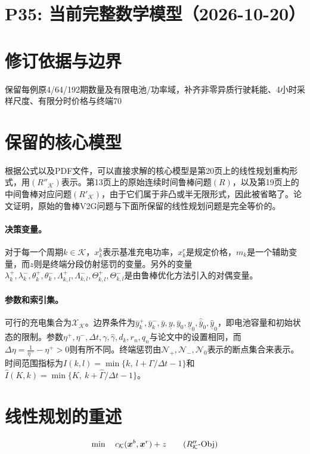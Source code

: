 \documentclass[11pt]{ctexart}
\begin{document}
\section*{P35: 当前完整数学模型（2026-10-20）}
\section*{修订依据与边界}保留每例原4/64/192期数量及有限电池/功率域，补齐非零异质行驶耗能、4小时采样尺度、有限分时价格与终端70%




\section*{保留的核心模型}
根据\texttt{}公式以及PDF文件，可以直接求解的核心模型是第20页上的线性规划重构形式，用$(R''_{\mathcal K})$表示。第13页上的原始连续时间鲁棒问题$(R)$，以及第19页上的中间鲁棒对应问题$(R'_{\mathcal K})$，由于它们属于非凸或半无限形式，因此被省略了。论文证明，原始的鲁棒V2G问题与下面所保留的线性规划问题是完全等价的。

\paragraph{决策变量。}
对于每一个周期$k \in \mathcal{K}$，$x_k^b$表示基准充电功率，$x_k^r$是规定价格，$m_k$是一个辅助变量，而$z$则是终端分段仿射惩罚的变量。另外的变量$\lambda_k^+,\lambda_k^-,\theta_k^+,\theta_k^-,\Lambda_{k,l}^+,\Lambda_{k,l}^-,
\Theta_{k,l}^+,\Theta_{k,l}^-$是由鲁棒优化方法引入的对偶变量。

\paragraph{参数和索引集。}
可行的充电集合为$\mathcal{X}_{\mathcal K}$。边界条件为$\bar y_k^+,\bar y_k^-,\bar y,\underline y,\bar y_0,\underline y_0,
\hat{\bar y}_0,\hat{\underline y}_0$，即电池容量和初始状态的限制。参数$\eta^+,\eta^-,\Delta t,\gamma,\hat{\gamma},d_k,r_n,q_n$与论文中的设置相同，而$\Delta\eta = \frac{1}{\eta^-} - \eta^+ > 0$则有所不同。终端惩罚由$\mathcal{N}_+,\mathcal{N}_-,\mathcal{N}_0$表示的断点集合来表示。时间范围指标为$I(k,l)=\min\{k,\ l+\Gamma/\Delta t-1\}$和$\hat I(K,k)=\min\{K,\ k+\hat{\Gamma}/\Delta t-1\}$。

\section*{线性规划的重述}
\begin{equation}
\min \quad c_{\mathcal K}(\boldsymbol{x}^b,\boldsymbol{x}^r) + z
\tag{\ensuremath{R''_{\mathcal K}}-Obj}
\end{equation}
\end{document}
